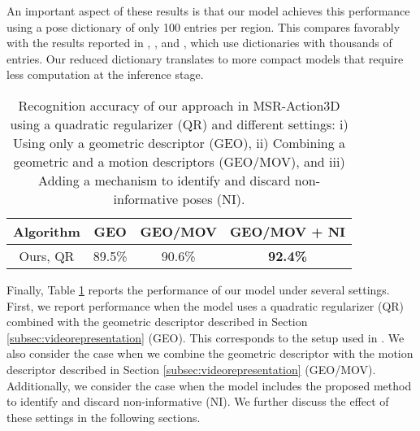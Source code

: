 An important aspect of these results is that our model achieves
this performance using a pose dictionary of only 100 entries per region.
This compares favorably with the results reported in \cite{Wang2012}, \cite{Wang2013}, and 
\cite{Xia},
which use dictionaries with thousands of entries.
Our reduced dictionary translates to more compact models that require
less computation at the inference stage. 




\begin{table}
\centering
\begin{tabular}{|c|c|c|c|}
\hline
\textbf{Algorithm} & \textbf{GEO} & \textbf{GEO/MOV} & \textbf{GEO/MOV + NI} \\
\hline
Ours, QR  &  89.5\% & 90.6\% & \textbf{92.4\%} \\
\hline
\end{tabular}
\caption{Recognition accuracy of our approach in MSR-Action3D using a quadratic regularizer 
(QR) and different settings: i) Using only a geometric 
descriptor (GEO), ii) Combining  a geometric and a motion descriptors (GEO/MOV), and iii) Adding a 
mechanism to identify and discard non-informative poses (NI).}
\label{tab:msr}
\end{table}

Finally, Table \ref{tab:msr} reports the performance of our model
under several settings. First, we report performance when
the model uses a quadratic regularizer (QR)
combined with the geometric descriptor described in Section 
\ref{subsec:videorepresentation} (GEO). This corresponds to the setup used in 
\cite{Lillo2014}. We also consider the case when we combine the geometric descriptor with the 
motion 
descriptor described in Section 
\ref{subsec:videorepresentation} (GEO/MOV). Additionally, we consider the case when the model 
includes the 
proposed method to identify and discard non-informative (NI).
We further discuss the effect of these settings in the following sections.

